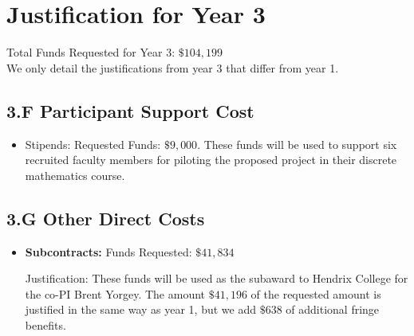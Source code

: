 \documentclass[11pt]{article}
\begin{document}

\section{Justification for Year 3}
\label{sec:justification_for_year_3}

Total Funds Requested for Year 3: $\$104,199$\\

\noindent
We only detail the justifications from year 3 that differ from year 1.

\subsection*{3.F Participant Support Cost }
\label{subsec:3.f_participant_support_cost_}
\begin{itemize}
\item Stipends: Requested Funds: $\$9,000$.  These funds will be used
  to support six recruited faculty members for piloting the proposed
  project in their discrete mathematics course.
\end{itemize}

\subsection*{3.G Other Direct Costs}
\label{subsec:other}

\begin{itemize}
\item \textbf{Subcontracts:} Funds Requested: $\$41,834$

  Justification: These funds will be used as the subaward to Hendrix
  College for the co-PI Brent Yorgey.  The amount $\$41,196$ of the
  requested amount is justified in the same way as year 1, but we add
  $\$638$ of additional fringe benefits.
\end{itemize}

\end{document}
